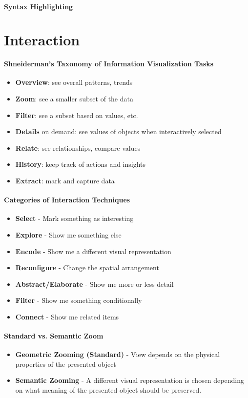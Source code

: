 \documentclass[10pt,a4paper]{article}
\begin{document}
	\paragraph{Syntax Highlighting}

\section{Interaction}
	\paragraph{Shneiderman’s Taxonomy of Information Visualization Tasks}
	\begin{itemize}
		\item \textbf{Overview}: see overall patterns, trends
		\item \textbf{Zoom}: see a smaller subset of the data
		\item \textbf{Filter}: see a subset based on values, etc.
		\item \textbf{Details} on demand: see values of objects when interactively selected
		\item \textbf{Relate}: see relationships, compare values
		\item \textbf{History}: keep track of actions and insights
		\item \textbf{Extract}: mark and capture data
	\end{itemize}

	\paragraph{Categories of Interaction Techniques}
	\begin{itemize}
		\item \textbf{Select} - Mark something as interesting
		\item \textbf{Explore} - Show me something else
		\item \textbf{Encode} - Show me a different visual representation
		\item \textbf{Reconfigure} - Change the spatial arrangement
		\item \textbf{Abstract/Elaborate} - Show me more or less detail
		\item \textbf{Filter} - Show me something conditionally
		\item \textbf{Connect} - Show me related items
	\end{itemize}

	\paragraph{Standard vs. Semantic Zoom}
	\begin{itemize}
		\item \textbf{Geometric Zooming (Standard)} - View depends on the physical properties of the presented object
		\item \textbf{Semantic Zooming} - A different visual representation is chosen depending on what meaning of the presented object should be preserved.
	\end{itemize}
\end{document}
